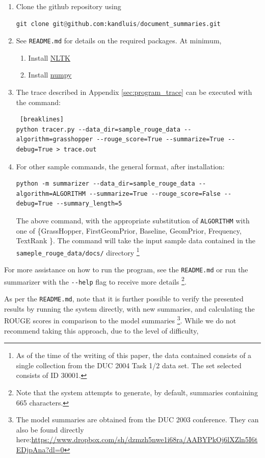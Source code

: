 \documentclass[10pt]{article}
\begin{document}
\begin{enumerate}
\item Clone the github repository using
\begin{lstlisting}[language=Python, caption="Git Clone Command"]
git clone git@github.com:kandluis/document_summaries.git
\end{lstlisting}
\item See \verb|README.md| for details on the required packages. At minimum,
\begin{enumerate}
\item Install \href{http://www.nltk.org/}{NLTK}
\item Install \href{http://www.numpy.org/}{numpy}
\end{enumerate}
\item The trace described in Appendix \ref{sec:program_trace} can be executed with the command:
\begin{lstlisting} [breaklines]
python tracer.py --data_dir=sample_rouge_data --algorithm=grasshopper --rouge_score=True --summarize=True --debug=True > trace.out
\end{lstlisting}
\item For other sample commands, the general format, after installation:
\begin{lstlisting}[breaklines]
python -m summarizer --data_dir=sample_rouge_data --algorithm=ALGORITHM --summarize=True --rouge_score=False --debug=True --summary_length=5
\end{lstlisting}
The above command, with the appropriate substitution of \verb|ALGORITHM| with one of \{GrassHopper,  FirstGeomPrior, Baseline, GeomPrior, Frequency, TextRank \}. The command will take the input sample data contained in the \verb|sameple_rouge_data/docs/| directory \footnote{As of the time of the writing of this paper, the data contained consists of a single collection from the DUC 2004 Task 1/2 data set. The set selected consists of ID 30001.}
\end{enumerate}
For more assistance on how to run the program, see the \verb|README.md| or run the summarizer with the \verb|--help| flag to receive more details \footnote{Note that the system attempts to generate, by default, summaries containing 665 characters.}.

As per the \verb|README.md|, note that it is further possible to verify the presented results by running the system directly, with new summaries, and calculating the ROUGE scores in comparison to the model summaries \footnote{The model summaries are obtained from the DUC 2003 conference. They can also be found directly here:\href{https://www.dropbox.com/sh/dzmzh5nwe1i68ra/AABYPkOj6lXZln5I6tEDjpAna?dl=0}{https://www.dropbox.com/sh/dzmzh5nwe1i68ra/AABYPkOj6lXZln5I6tEDjpAna?dl=0}}. While we do not recommend taking this approach, due to the level of difficulty,
\end{document}
